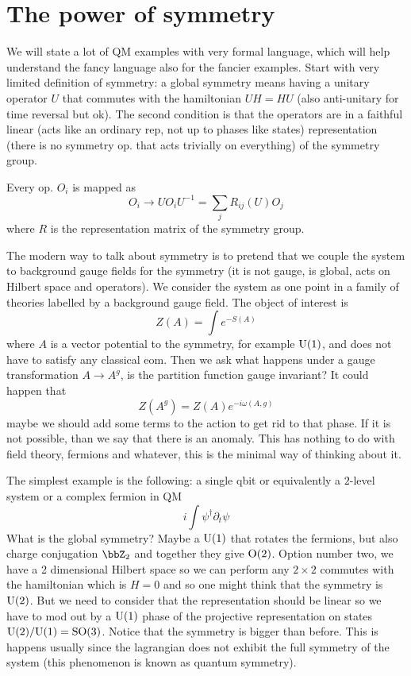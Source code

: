 \chapter{The power of symmetry}
We will state a lot of QM examples with very formal language, which will help understand the fancy language also for the fancier examples. Start with very limited definition of symmetry: a global symmetry means having a unitary operator $U$ that commutes with the hamiltonian $UH=HU$ (also anti-unitary for time reversal but ok). The second condition is that the operators are in a faithful linear (acts like an ordinary rep, not up to phases like states) representation (there is no symmetry op. that acts trivially on everything) of the symmetry group. 

Every op. $O_{i}$ is mapped as 
\begin{equation}
	O_{i}\rightarrow U O_{i}U^{-1}=\sum_{j}R_{ij}(U)O_{j}
\end{equation}
where $R$ is the representation matrix of the symmetry group.

The modern way to talk about symmetry is to pretend that we couple the system to background gauge fields for the symmetry (it is not gauge, is global, acts on Hilbert space and operators). We consider the system as one point in a family of theories labelled by a background gauge field. The object of interest is 
\begin{equation}
	Z(A)=\int e^{-S(A)}
\end{equation}
where $A$ is a vector potential to the symmetry, for example $\mathrm{U}(1)$, and does not have to satisfy any classical eom. Then we ask what happens under a gauge transformation $A\rightarrow A^{g}$, is the partition function gauge invariant? It could happen that
\begin{equation}
	Z(A^{g})=Z(A)e^{-i\omega(A,g)}
\end{equation}
maybe we should add some terms to the action to get rid to that phase. If it is not possible, than we say that there is an anomaly. This has nothing to do with field theory, fermions and whatever, this is the minimal way of thinking about it.

The simplest example is the following: a single qbit or equivalently a $2$-level system or a complex fermion in QM
\begin{equation}
	i\int\psi^{\dagger}\partial_{t}\psi
\end{equation}
What is the global symmetry? Maybe a $\mathrm{U}(1)$ that rotates the fermions, but also charge conjugation $\bbZ_{2}$ and together they give $\mathrm{O}(2)$. Option number two, we have a 2 dimensional Hilbert space so we can perform any $2\times 2$ commutes with the hamiltonian which is $H=0$ and so one might think that the symmetry is $\mathrm{U}(2)$. But we need to consider that the representation should be linear so we have to mod out by a $\mathrm{U}(1)$ phase of the projective representation on states $\mathrm{U}(2)/\mathrm{U}(1)=\mathrm{SO}(3)$. Notice that the symmetry is bigger than before. This is happens usually since the lagrangian does not exhibit the full symmetry of the system (this phenomenon is known as quantum symmetry).

